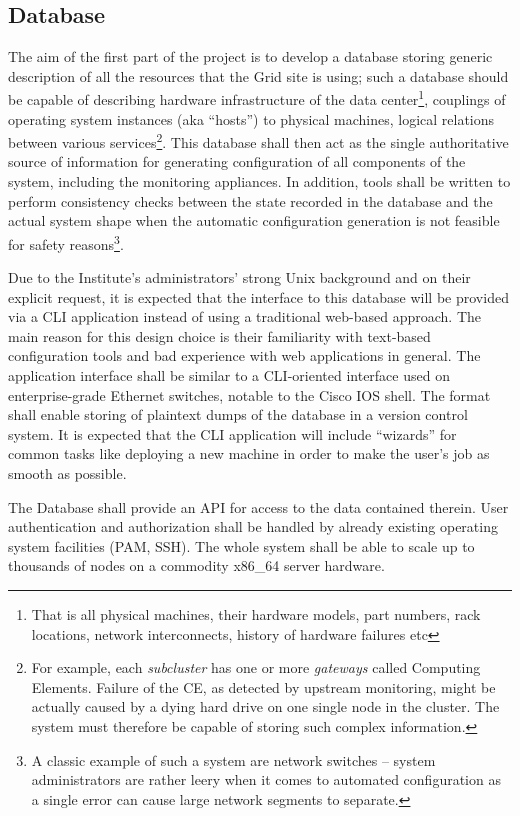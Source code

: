 \documentclass{article}
\begin{document}
\subsection{Database}

The aim of the first part of the project is to develop a database storing generic description of all the resources that the Grid
site is using; such a database should be capable of describing hardware infrastructure of the data center\footnote{That is all
physical machines, their hardware models, part numbers, rack locations, network interconnects, history of hardware failures etc},
couplings of operating system instances (aka ``hosts'') to physical machines, logical relations between various
services\footnote{For example, each {\em subcluster} has one or more {\em gateways} called Computing Elements.  Failure of the CE,
as detected by upstream monitoring, might be actually caused by a dying hard drive on one single node in the cluster.  The system
must therefore be capable of storing such complex information.}.  This database shall then act as the single authoritative source
of information for generating configuration of all components of the system, including the monitoring appliances.  In addition,
tools shall be written to perform consistency checks between the state recorded in the database and the actual system shape when
the automatic configuration generation is not feasible for safety reasons\footnote{A classic example of such a system are network
switches -- system administrators are rather leery when it comes to automated configuration as a single error can cause large
network segments to separate.}.

Due to the Institute's administrators' strong Unix background and on their explicit request, it is expected that the interface to
this database will be provided via a CLI application instead of using a traditional web-based approach.  The main reason for this
design choice is their familiarity with text-based configuration tools and bad experience with web applications in general.  The
application interface shall be similar to a CLI-oriented interface used on enterprise-grade Ethernet switches, notable to the
Cisco IOS shell.  The format shall enable storing of plaintext dumps of the database in a version control system.  It is expected
that the CLI application will include ``wizards'' for common tasks like deploying a new machine in order to make the user's job as
smooth as possible.

The Database shall provide an API for access to the data contained therein.  User authentication and authorization shall be
handled by already existing operating system facilities (PAM, SSH).  The whole system shall be able to scale up to thousands of
nodes on a commodity x86\_64 server hardware.
\end{document}
